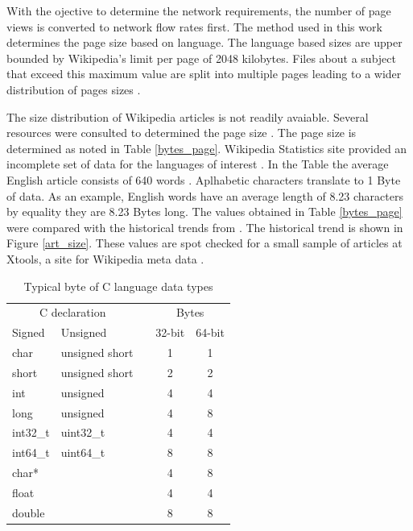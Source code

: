 \documentclass[conference]{IEEEtran}
\begin{document}
With the ojective to determine the network requirements, the number of page views is converted to network flow rates first. The method used in this work determines the page size based on language. The language based sizes are upper bounded by Wikipedia's limit per page of 2048 kilobytes. Files about a subject that exceed this maximum value are split into multiple pages leading to a wider distribution of pages sizes \cite{wiki_size}. 

The size distribution of Wikipedia articles is not readily avaiable. Several resources were consulted to determined the page size \cite{wiki_avg_article, wiki_stats,xtools}. The page size is determined as noted in Table \ref{bytes_page}. Wikipedia Statistics site provided an incomplete set of data for the languages of interest \cite{wiki_stats}. In the Table the average English article consists of 640 words \cite{wiki_avg_article}. Aplhabetic characters translate to 1 Byte of data. As an example, English words have an average length of 8.23 characters by equality they are 8.23 Bytes long. The values obtained in Table \ref{bytes_page} were compared with the historical trends from \cite{wiki_stats}. The historical trend is shown in Figure \ref{art_size}. These values are spot checked for a small sample of articles at Xtools, a site for Wikipedia meta data \cite{xtools}. 

\begin{table}[htbp]
\caption{Typical byte of C language data types \cite{Bryant}}
\begin{center}
\begin{tabular}{llccc}
\hline\hline
\multicolumn{2}{c}{C declaration}  &{}&\multicolumn{2}{c}{Bytes}\\
\cline{1-2}
\cline{4-5}
Signed          &        Unsigned  &{}&  32-bit &  64-bit \\
\hline
 [signed]char   &  unsigned short  &{}&     1   &       1 \\
       short    &  unsigned short  &{}&     2   &       2 \\
          int   &        unsigned  &{}&     4   &       4 \\
         long   &        unsigned  &{}&     4   &       8 \\
       int32\_t &        uint32\_t &{}&     4   &       4 \\
       int64\_t &        uint64\_t &{}&     8   &       8 \\
         char*  &                  &{}&     4   &       8 \\
         float  &                  &{}&     4   &       4 \\
        double  &                  &{}&     8   &       8 \\
\hline
\end{tabular}
\label{Clang}
\end{center}
\end{table}
\end{document}
